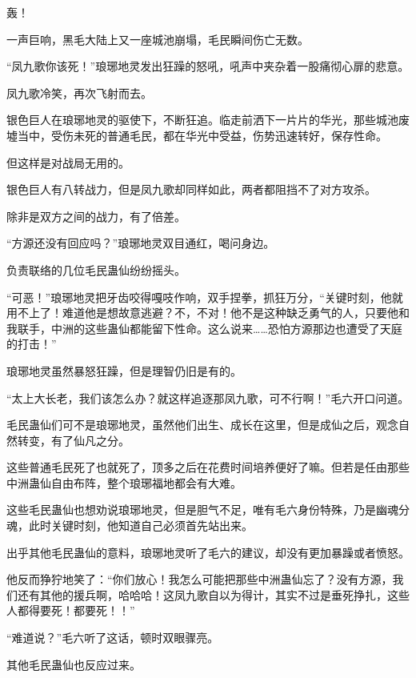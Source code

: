 
\begin{this_body}



轰！

一声巨响，黑毛大陆上又一座城池崩塌，毛民瞬间伤亡无数。

“凤九歌你该死！”琅琊地灵发出狂躁的怒吼，吼声中夹杂着一股痛彻心扉的悲意。

凤九歌冷笑，再次飞射而去。

银色巨人在琅琊地灵的驱使下，不断狂追。临走前洒下一片片的华光，那些城池废墟当中，受伤未死的普通毛民，都在华光中受益，伤势迅速转好，保存性命。

但这样是对战局无用的。

银色巨人有八转战力，但是凤九歌却同样如此，两者都阻挡不了对方攻杀。

除非是双方之间的战力，有了倍差。

“方源还没有回应吗？”琅琊地灵双目通红，喝问身边。

负责联络的几位毛民蛊仙纷纷摇头。

“可恶！”琅琊地灵把牙齿咬得嘎吱作响，双手捏拳，抓狂万分，“关键时刻，他就用不上了！难道他是想故意逃避？不，不对！他不是这种缺乏勇气的人，只要他和我联手，中洲的这些蛊仙都能留下性命。这么说来……恐怕方源那边也遭受了天庭的打击！”

琅琊地灵虽然暴怒狂躁，但是理智仍旧是有的。

“太上大长老，我们该怎么办？就这样追逐那凤九歌，可不行啊！”毛六开口问道。

毛民蛊仙们可不是琅琊地灵，虽然他们出生、成长在这里，但是成仙之后，观念自然转变，有了仙凡之分。

这些普通毛民死了也就死了，顶多之后在花费时间培养便好了嘛。但若是任由那些中洲蛊仙自由布阵，整个琅琊福地都会有大难。

这些毛民蛊仙也想劝说琅琊地灵，但是胆气不足，唯有毛六身份特殊，乃是幽魂分魂，此时关键时刻，他知道自己必须首先站出来。

出乎其他毛民蛊仙的意料，琅琊地灵听了毛六的建议，却没有更加暴躁或者愤怒。

他反而狰狞地笑了：“你们放心！我怎么可能把那些中洲蛊仙忘了？没有方源，我们还有其他的援兵啊，哈哈哈！这凤九歌自以为得计，其实不过是垂死挣扎，这些人都得要死！都要死！！”

“难道说？”毛六听了这话，顿时双眼骤亮。

其他毛民蛊仙也反应过来。


\end{this_body}
